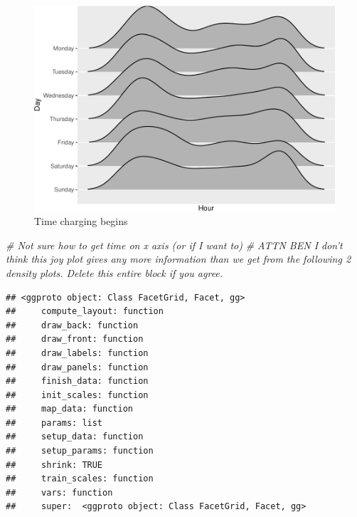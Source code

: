 \documentclass[]{article}
\newenvironment{Shaded}{\begin{snugshade}}{\end{snugshade}}
\newcommand{\KeywordTok}[1]{\textcolor[rgb]{0.13,0.29,0.53}{\textbf{#1}}}
\newcommand{\DataTypeTok}[1]{\textcolor[rgb]{0.13,0.29,0.53}{#1}}
\newcommand{\FloatTok}[1]{\textcolor[rgb]{0.00,0.00,0.81}{#1}}
\newcommand{\StringTok}[1]{\textcolor[rgb]{0.31,0.60,0.02}{#1}}
\newcommand{\CommentTok}[1]{\textcolor[rgb]{0.56,0.35,0.01}{\textit{#1}}}
\newcommand{\OperatorTok}[1]{\textcolor[rgb]{0.81,0.36,0.00}{\textbf{#1}}}
\newcommand{\NormalTok}[1]{#1}
\begin{document}
\begin{figure}
\centering
\includegraphics{EVBB_SummaryReport_files/figure-latex/ggjoyplotTimeChargingBegins-1.pdf}
\caption{\label{fig:ggjoyplotTimeChargingBegins}Time charging begins}
\end{figure}

\begin{Shaded}
\begin{Highlighting}[]
\CommentTok{# Not sure how to get time on x axis (or if I want to)}
\CommentTok{# ATTN BEN I don't think this joy plot gives any more information than we get from the following 2 density plots. Delete this entire block if you agree.}
\end{Highlighting}
\end{Shaded}

\begin{Shaded}
\end{Shaded}

\begin{verbatim}
## <ggproto object: Class FacetGrid, Facet, gg>
##     compute_layout: function
##     draw_back: function
##     draw_front: function
##     draw_labels: function
##     draw_panels: function
##     finish_data: function
##     init_scales: function
##     map_data: function
##     params: list
##     setup_data: function
##     setup_params: function
##     shrink: TRUE
##     train_scales: function
##     vars: function
##     super:  <ggproto object: Class FacetGrid, Facet, gg>
\end{verbatim}
\end{document}
